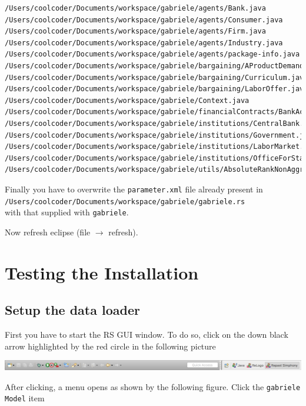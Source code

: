 \documentclass{book}
\begin{document}
\begin{verbatim}
/Users/coolcoder/Documents/workspace/gabriele/agents/Bank.java
/Users/coolcoder/Documents/workspace/gabriele/agents/Consumer.java
/Users/coolcoder/Documents/workspace/gabriele/agents/Firm.java
/Users/coolcoder/Documents/workspace/gabriele/agents/Industry.java
/Users/coolcoder/Documents/workspace/gabriele/agents/package-info.java
/Users/coolcoder/Documents/workspace/gabriele/bargaining/AProductDemand.java
/Users/coolcoder/Documents/workspace/gabriele/bargaining/Curriculum.java
/Users/coolcoder/Documents/workspace/gabriele/bargaining/LaborOffer.java
/Users/coolcoder/Documents/workspace/gabriele/Context.java
/Users/coolcoder/Documents/workspace/gabriele/financialContracts/BankAccount.java
/Users/coolcoder/Documents/workspace/gabriele/institutions/CentralBank.java
/Users/coolcoder/Documents/workspace/gabriele/institutions/Government.java
/Users/coolcoder/Documents/workspace/gabriele/institutions/LaborMarket.java
/Users/coolcoder/Documents/workspace/gabriele/institutions/OfficeForStatistics.java
/Users/coolcoder/Documents/workspace/gabriele/utils/AbsoluteRankNonAggregateDataSource.java
\end{verbatim}

Finally you have to overwrite the \verb+parameter.xml+ file already present in\\  
\verb+/Users/coolcoder/Documents/workspace/gabriele/gabriele.rs+\\
with that supplied with \verb+gabriele+.
\fi


Now refresh eclipse (file $\rightarrow$ refresh).



\section{Testing the Installation}
\subsection{Setup the data loader}


First you have to start the RS GUI window. To do so, click on the down black arrow highlighted by the red circle in the following picture

\noindent
\includegraphics[scale=0.35]{fig_gabriele_rs_execution1}

After clicking, a menu opens as shown by the following figure. Click the \verb+gabriele Model+ item
\end{document}
